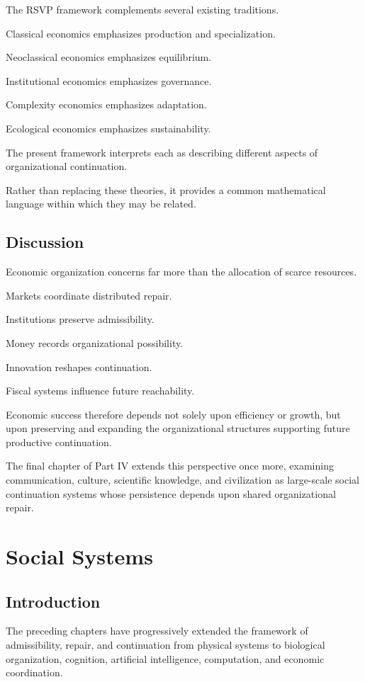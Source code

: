 \documentclass[11pt,oneside]{book}
\numberwithin{equation}{chapter}
\theoremstyle{definition}
\theoremstyle{plain}
\begin{document}
The RSVP framework complements several existing traditions.

Classical economics emphasizes production and specialization.

Neoclassical economics emphasizes equilibrium.

Institutional economics emphasizes governance.

Complexity economics emphasizes adaptation.

Ecological economics emphasizes sustainability.

The present framework interprets each as describing different aspects of
organizational continuation.

Rather than replacing these theories, it provides a common mathematical
language within which they may be related.

\section{Discussion}

Economic organization concerns far more than the allocation of scarce
resources.

Markets coordinate distributed repair.

Institutions preserve admissibility.

Money records organizational possibility.

Innovation reshapes continuation.

Fiscal systems influence future reachability.

Economic success therefore depends not solely upon efficiency or growth,
but upon preserving and expanding the organizational structures supporting
future productive continuation.

The final chapter of Part IV extends this perspective once more, examining
communication, culture, scientific knowledge, and civilization as
large-scale social continuation systems whose persistence depends upon
shared organizational repair.

\chapter{Social Systems}

\section{Introduction}

The preceding chapters have progressively extended the framework of
admissibility, repair, and continuation from physical systems to
biological organization, cognition, artificial intelligence, computation,
and economic coordination.
\end{document}
